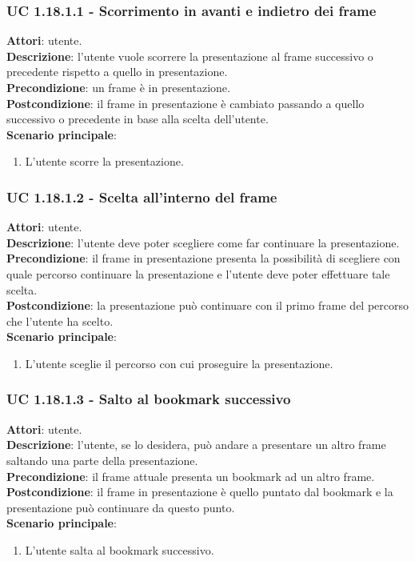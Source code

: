 	\subsubsection{UC 1.18.1.1 - Scorrimento in avanti e indietro dei frame}{
		\label{uc1.18.1.1}
		\textbf{Attori}: utente. \\
		\textbf{Descrizione}: l'utente vuole scorrere la presentazione al frame successivo o precedente rispetto a quello in presentazione. \\
		\textbf{Precondizione}: un frame è in presentazione.	\\
		\textbf{Postcondizione}: il frame in presentazione è cambiato passando a quello successivo o precedente in base alla scelta dell'utente.\\
		\textbf{Scenario principale}:
		\begin{enumerate}
			\item L'utente scorre la presentazione.
		\end{enumerate}
	}
	\subsubsection{UC 1.18.1.2 - Scelta all'interno del frame}{
		\label{uc1.18.1.2}
		\textbf{Attori}: utente. \\
		\textbf{Descrizione}: l'utente deve poter scegliere come far continuare la presentazione. \\
		\textbf{Precondizione}: il frame in presentazione presenta la possibilità di scegliere con quale percorso continuare la presentazione e l'utente deve poter effettuare tale scelta.	\\
		\textbf{Postcondizione}: la presentazione può continuare con il primo frame del percorso che l'utente ha scelto.\\
		\textbf{Scenario principale}:
		\begin{enumerate}
			\item L'utente sceglie il percorso con cui proseguire la presentazione.
		\end{enumerate}
	}
	\subsubsection{UC 1.18.1.3 - Salto al bookmark successivo}{
		\label{uc1.18.1.3}
		\textbf{Attori}: utente. \\
		\textbf{Descrizione}: l'utente, se lo desidera, può andare a presentare un altro frame saltando una parte della presentazione. \\
		\textbf{Precondizione}: il frame attuale presenta un bookmark ad un altro frame.	\\
		\textbf{Postcondizione}: il frame in presentazione è quello puntato dal bookmark e la presentazione può continuare da questo punto.	\\
		\textbf{Scenario principale}:
		\begin{enumerate}
			\item L'utente salta al bookmark successivo.
		\end{enumerate}
	}
